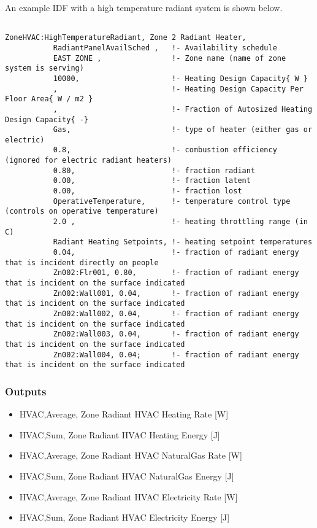 An example IDF with a high temperature radiant system is shown below.

\begin{lstlisting}

ZoneHVAC:HighTemperatureRadiant, Zone 2 Radiant Heater,
           RadiantPanelAvailSched ,   !- Availability schedule
           EAST ZONE ,                !- Zone name (name of zone system is serving)
           10000,                     !- Heating Design Capacity{ W }
           ,                          !- Heating Design Capacity Per Floor Area{ W / m2 }
           ,                          !- Fraction of Autosized Heating Design Capacity{ -}
           Gas,                       !- type of heater (either gas or electric)
           0.8,                       !- combustion efficiency (ignored for electric radiant heaters)
           0.80,                      !- fraction radiant
           0.00,                      !- fraction latent
           0.00,                      !- fraction lost
           OperativeTemperature,      !- temperature control type (controls on operative temperature)
           2.0 ,                      !- heating throttling range (in C)
           Radiant Heating Setpoints, !- heating setpoint temperatures
           0.04,                      !- fraction of radiant energy that is incident directly on people
           Zn002:Flr001, 0.80,        !- fraction of radiant energy that is incident on the surface indicated
           Zn002:Wall001, 0.04,       !- fraction of radiant energy that is incident on the surface indicated
           Zn002:Wall002, 0.04,       !- fraction of radiant energy that is incident on the surface indicated
           Zn002:Wall003, 0.04,       !- fraction of radiant energy that is incident on the surface indicated
           Zn002:Wall004, 0.04;       !- fraction of radiant energy that is incident on the surface indicated
\end{lstlisting}

\subsubsection{Outputs}\label{outputs-8-006}

\begin{itemize}
\item
  HVAC,Average, Zone Radiant HVAC Heating Rate {[}W{]}
\item
  HVAC,Sum, Zone Radiant HVAC Heating Energy {[}J{]}
\item
  HVAC,Average, Zone Radiant HVAC NaturalGas Rate {[}W{]}
\item
  HVAC,Sum, Zone Radiant HVAC NaturalGas Energy {[}J{]}
\item
  HVAC,Average, Zone Radiant HVAC Electricity Rate {[}W{]}
\item
  HVAC,Sum, Zone Radiant HVAC Electricity Energy {[}J{]}
\end{itemize}

